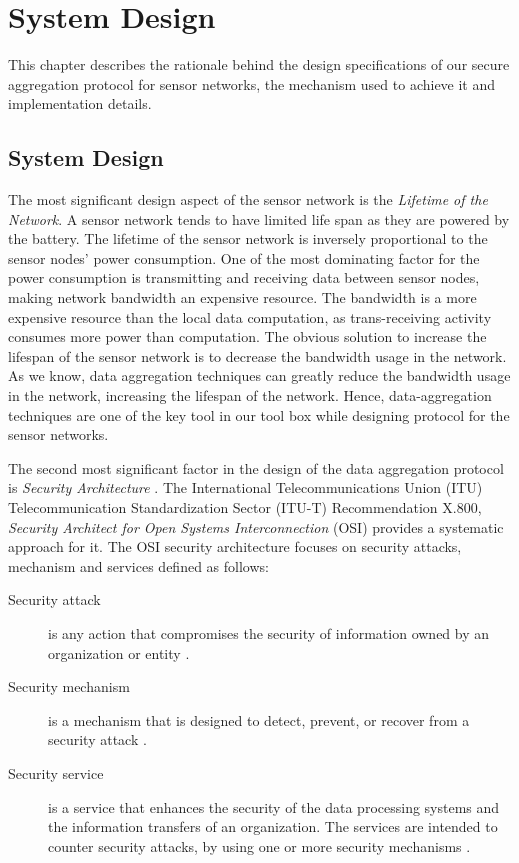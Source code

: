 \chapter{System Design} %
\label{cha:System Design}
	
	This chapter describes the rationale behind the design specifications of our secure aggregation protocol for sensor networks, the mechanism used to achieve it and implementation details.

	\section{System Design}

	The most significant design aspect of the sensor network is the \textit{Lifetime of the Network}.
	A sensor network tends to have limited life span as they are powered by the battery.
	The lifetime of the sensor network is inversely proportional to the sensor nodes' power consumption.
	One of the most dominating factor for the power consumption is transmitting and receiving data between sensor nodes, making network bandwidth an expensive resource.
	The bandwidth is a more expensive resource than the local data computation, as trans-receiving activity consumes more power than computation.
	The obvious solution to increase the lifespan of the sensor network is to decrease the bandwidth usage in the network.
	As we know, data aggregation techniques can greatly reduce the bandwidth usage in the network, increasing the lifespan of the network.
	Hence, data-aggregation techniques are one of the key tool in our tool box while designing protocol for the sensor networks.

	The second most significant factor in the design of the data aggregation protocol is \textit{Security Architecture }.
	The International Telecommunications Union (ITU) Telecommunication Standardization Sector (ITU-T) Recommendation X.800, \textit{Security Architect for Open Systems Interconnection} (OSI) provides a systematic approach for it.
	The OSI security architecture focuses on security attacks, mechanism and services defined as follows:
	\begin{description}
		\item[Security attack] is any action that compromises the security of information owned by an organization or entity \cite{stallings2008computer}.
		\item[Security mechanism] is a mechanism that is designed to detect, prevent, or recover from a security attack
		\cite{stallings2008computer}.
		\item[Security service] is a service that enhances the security of the data processing systems and the information transfers of an organization. The services are intended to counter security attacks, by using one or more security mechanisms \cite{stallings2008computer}.

	\end{description}

